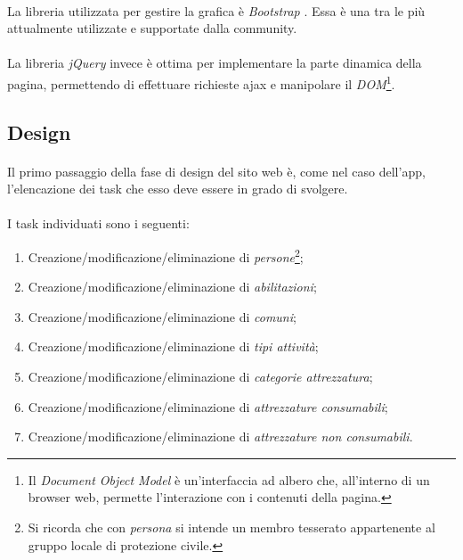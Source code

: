 \documentclass[11pt,a4paper,english]{article}
\begin{document}
\paragraph{} La libreria utilizzata per gestire la grafica è \emph{Bootstrap} \cite{bootstrap}. Essa è una tra le più attualmente utilizzate e supportate dalla community.

\paragraph{} La libreria \emph{jQuery} \cite{jquery} invece è ottima per implementare la parte dinamica della pagina, permettendo di effettuare richieste ajax e manipolare il \emph{DOM}\footnote{Il \emph{Document Object Model} è un'interfaccia ad albero che, all'interno di un browser web, permette l'interazione con i contenuti della pagina.}.


\subsection{Design}

\paragraph{} Il primo passaggio della fase di design del sito web è, come nel caso dell'app, l'elencazione dei task che esso deve essere in grado di svolgere. 

\paragraph{} I task individuati sono i seguenti:
\begin{enumerate}
    \item Creazione/modificazione/eliminazione di \emph{persone}\footnote{Si ricorda che con \emph{persona} si intende un membro tesserato appartenente al gruppo locale di protezione civile.};
    \item Creazione/modificazione/eliminazione di \emph{abilitazioni};
    \item Creazione/modificazione/eliminazione di \emph{comuni};
    \item Creazione/modificazione/eliminazione di \emph{tipi attività};
    \item Creazione/modificazione/eliminazione di \emph{categorie attrezzatura};
    \item Creazione/modificazione/eliminazione di \emph{attrezzature consumabili};
    \item Creazione/modificazione/eliminazione di \emph{attrezzature non consumabili}.
\end{enumerate}
\end{document}
